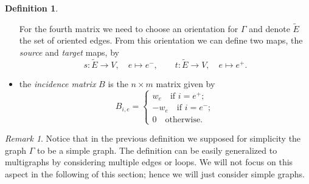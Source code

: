 \documentclass[a4paper,12 pt,titlepage,twoside]{book}
\theoremstyle{plain}
\theoremstyle{theorem}
\theoremstyle{definition}
\newtheorem{defn}[thm]{Definition}
\theoremstyle{remark}
\newtheorem{oss}[thm]{Remark}
\begin{document}
\begin{defn}
\begin{itemize}
			For the fourth matrix we need to choose an orientation for $\Gamma$ and denote $\tilde{E}$ the set of oriented edges. From this orientation we can define two maps, the \emph{source} and \emph{target} maps, by $$s \colon \tilde{E} \rightarrow V, \quad e \mapsto e^-, \qquad t \colon \tilde{E} \rightarrow V, \quad e \mapsto e^+.$$
			\item the \emph{incidence matrix} $B$ is the $n \times m$ matrix given by $$B_{i,e} = \begin{cases}
			w_e \quad \text{if } i = e^+;\\ 
			-w_e \quad \text{if } i = e^-;\\
			0 \quad \text{otherwise}.
			\end{cases}$$
		\end{itemize}
	\end{defn}
	\begin{oss}
		Notice that in the previous definition we supposed for simplicity the graph $\Gamma$ to be a simple graph. The definition can be easily generalized to multigraphs by considering multiple edges or loops. We will not focus on this aspect in the following of this section; hence we will just consider simple graphs.
	\end{oss}
\end{document}
